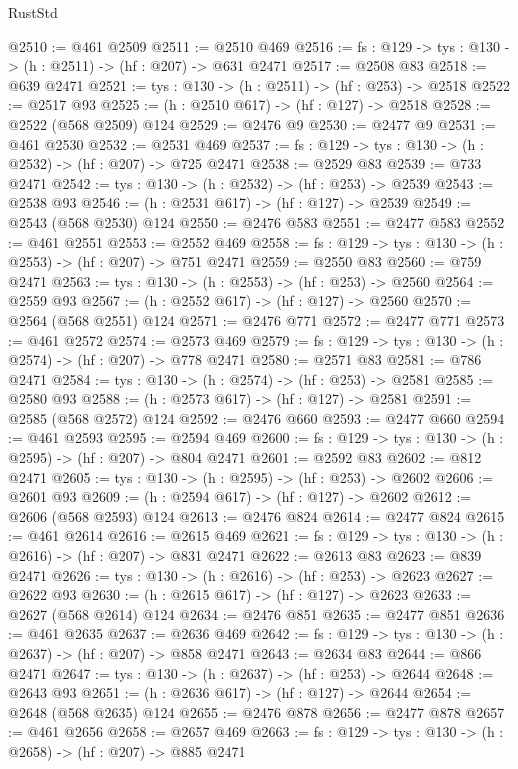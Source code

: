 \begin{lexlean}{RustStd}
\begin{coremodule}
{\begin{coremodule}
{{{{{{{{{{{{{{{@2510 := @461 @2509
@2511 := @2510 @469
@2516 := {fs : @129} -> {tys : @130} -> (h : @2511) -> (hf : @207) -> @631 @2471
@2517 := @2508 @83
@2518 := @639 @2471
@2521 := {tys : @130} -> (h : @2511) -> (hf : @253) -> @2518
@2522 := @2517 @93
@2525 := (h : @2510 @617) -> (hf : @127) -> @2518
@2528 := @2522 (@568 @2509) @124
@2529 := @2476 @9
@2530 := @2477 @9
@2531 := @461 @2530
@2532 := @2531 @469
@2537 := {fs : @129} -> {tys : @130} -> (h : @2532) -> (hf : @207) -> @725 @2471
@2538 := @2529 @83
@2539 := @733 @2471
@2542 := {tys : @130} -> (h : @2532) -> (hf : @253) -> @2539
@2543 := @2538 @93
@2546 := (h : @2531 @617) -> (hf : @127) -> @2539
@2549 := @2543 (@568 @2530) @124
@2550 := @2476 @583
@2551 := @2477 @583
@2552 := @461 @2551
@2553 := @2552 @469
@2558 := {fs : @129} -> {tys : @130} -> (h : @2553) -> (hf : @207) -> @751 @2471
@2559 := @2550 @83
@2560 := @759 @2471
@2563 := {tys : @130} -> (h : @2553) -> (hf : @253) -> @2560
@2564 := @2559 @93
@2567 := (h : @2552 @617) -> (hf : @127) -> @2560
@2570 := @2564 (@568 @2551) @124
@2571 := @2476 @771
@2572 := @2477 @771
@2573 := @461 @2572
@2574 := @2573 @469
@2579 := {fs : @129} -> {tys : @130} -> (h : @2574) -> (hf : @207) -> @778 @2471
@2580 := @2571 @83
@2581 := @786 @2471
@2584 := {tys : @130} -> (h : @2574) -> (hf : @253) -> @2581
@2585 := @2580 @93
@2588 := (h : @2573 @617) -> (hf : @127) -> @2581
@2591 := @2585 (@568 @2572) @124
@2592 := @2476 @660
@2593 := @2477 @660
@2594 := @461 @2593
@2595 := @2594 @469
@2600 := {fs : @129} -> {tys : @130} -> (h : @2595) -> (hf : @207) -> @804 @2471
@2601 := @2592 @83
@2602 := @812 @2471
@2605 := {tys : @130} -> (h : @2595) -> (hf : @253) -> @2602
@2606 := @2601 @93
@2609 := (h : @2594 @617) -> (hf : @127) -> @2602
@2612 := @2606 (@568 @2593) @124
@2613 := @2476 @824
@2614 := @2477 @824
@2615 := @461 @2614
@2616 := @2615 @469
@2621 := {fs : @129} -> {tys : @130} -> (h : @2616) -> (hf : @207) -> @831 @2471
@2622 := @2613 @83
@2623 := @839 @2471
@2626 := {tys : @130} -> (h : @2616) -> (hf : @253) -> @2623
@2627 := @2622 @93
@2630 := (h : @2615 @617) -> (hf : @127) -> @2623
@2633 := @2627 (@568 @2614) @124
@2634 := @2476 @851
@2635 := @2477 @851
@2636 := @461 @2635
@2637 := @2636 @469
@2642 := {fs : @129} -> {tys : @130} -> (h : @2637) -> (hf : @207) -> @858 @2471
@2643 := @2634 @83
@2644 := @866 @2471
@2647 := {tys : @130} -> (h : @2637) -> (hf : @253) -> @2644
@2648 := @2643 @93
@2651 := (h : @2636 @617) -> (hf : @127) -> @2644
@2654 := @2648 (@568 @2635) @124
@2655 := @2476 @878
@2656 := @2477 @878
@2657 := @461 @2656
@2658 := @2657 @469
@2663 := {fs : @129} -> {tys : @130} -> (h : @2658) -> (hf : @207) -> @885 @2471
}}}}}}}}}}}}}}}
\end{coremodule}}
\end{coremodule}
\end{lexlean}
